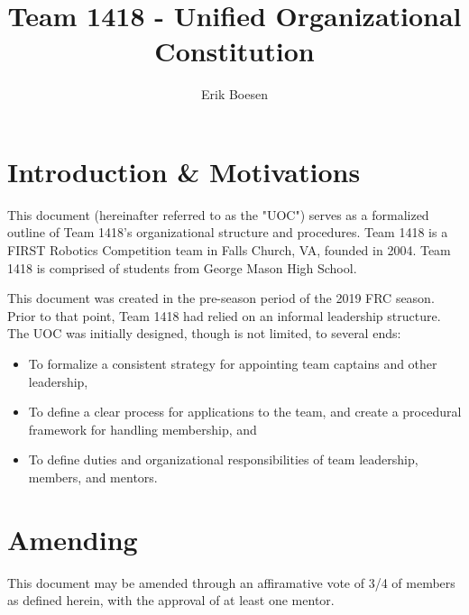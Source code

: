 \documentclass{proc}
\begin{document}
\title{Team 1418 - Unified Organizational Constitution}
\author{Erik Boesen}

\maketitle

\section{Introduction & Motivations}
This document (hereinafter referred to as the "UOC") serves as a formalized outline of Team 1418's organizational structure and procedures. Team 1418 is a FIRST Robotics Competition team in Falls Church, VA, founded in 2004. Team 1418 is comprised of students from George Mason High School.

This document was created in the pre-season period of the 2019 FRC season. Prior to that point, Team 1418 had relied on an informal leadership structure. The UOC was initially designed, though is not limited, to several ends:
\begin{itemize}
  \item{To formalize a consistent strategy for appointing team captains and other leadership,}
  \item{To define a clear process for applications to the team, and create a procedural framework for handling membership, and}
  \item{To define duties and organizational responsibilities of team leadership, members, and mentors.}
\end{itemize}

\section{Amending}
This document may be amended through an affiramative vote of 3/4 of members as defined herein, with the approval of at least one mentor.
\end{document}
